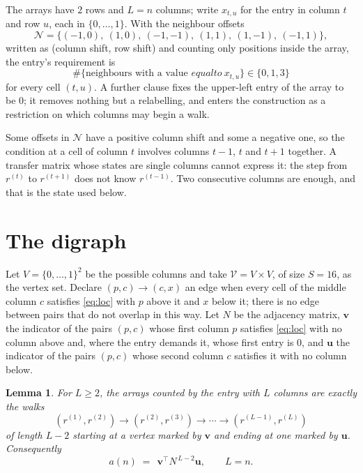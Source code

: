 \documentclass[11pt,a4paper]{article}
\theoremstyle{plain}
\newtheorem{lemma}[theorem]{Lemma}
\theoremstyle{definition}
\begin{document}
The arrays have $2$ rows and $L=n$ columns; write $x_{t,u}$ for the entry in
column $t$ and row $u$, each in $\{0,\dots,1\}$. With the neighbour offsets
\[
\mathcal N=\{(-1,0),\ (1,0),\ (-1,-1),\ (1,1),\ (1,-1),\ (-1,1)\},
\]
written as (column shift, row shift) and counting only positions inside the array, the
entry's requirement is
\begin{equation}\label{eq:loc}
\#\{\text{neighbours with a value }equal to\ x_{t,u}\}\in\{0,1,3\}
\end{equation}
for every cell $(t,u)$. A further clause fixes the upper-left entry of the array to be $0$; it removes nothing but a relabelling, and enters the construction as a restriction on which columns may begin a walk.

Some offsets in $\mathcal N$ have a positive column shift and some a negative one, so the
condition at a cell of column $t$ involves columns $t-1$, $t$ and $t+1$ together. A transfer
matrix whose states are single columns cannot express it: the step from $r^{(t)}$ to
$r^{(t+1)}$ does not know $r^{(t-1)}$. Two consecutive columns are enough, and that is
the state used below.

\section{The digraph}

Let $V=\{0,\dots,1\}^{2}$ be the possible columns and take
$\mathcal V=V\times V$, of size $S=16$, as the vertex set. Declare $(p,c)\to(c,x)$ an edge
when every cell of the middle column $c$ satisfies \eqref{eq:loc} with $p$ above it and $x$
below it; there is no edge between pairs that do not overlap in this way. Let $N$ be the
adjacency matrix, $\mathbf{v}$ the indicator of the pairs $(p,c)$ whose first column $p$
satisfies \eqref{eq:loc} with no column above and, where the entry demands it, whose first entry is $0$, and $\mathbf{u}$ the indicator of
the pairs $(p,c)$ whose second column $c$ satisfies it with no column below.

\begin{lemma}\label{lem:walk}
For $L\ge2$, the arrays counted by the entry with $L$ columns are exactly the walks
\[
(r^{(1)},r^{(2)})\to(r^{(2)},r^{(3)})\to\cdots\to(r^{(L-1)},r^{(L)})
\]
of length $L-2$ starting at a vertex marked by $\mathbf{v}$ and ending at one marked by
$\mathbf{u}$. Consequently
\[
a(n)\;=\;\,\mathbf{v}^{\!\top}N^{\,L-2}\mathbf{u},\qquad L=n .
\]
\end{lemma}
\end{document}
